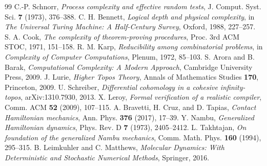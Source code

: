 \begin{thebibliography}{99}
 C.-P. Schnorr, \emph{Process complexity and effective random tests}, J. Comput. Syst. Sci. \textbf{7} (1973), 376--388.
 C. H. Bennett, \emph{Logical depth and physical complexity}, in \emph{The Universal Turing Machine: A Half-Century Survey}, Oxford, 1988, 227--257.
 S. A. Cook, \emph{The complexity of theorem-proving procedures}, Proc. 3rd ACM STOC, 1971, 151--158.
 R. M. Karp, \emph{Reducibility among combinatorial problems}, in \emph{Complexity of Computer Computations}, Plenum, 1972, 85--103.
 S. Arora and B. Barak, \emph{Computational Complexity: A Modern Approach}, Cambridge University Press, 2009.
 J. Lurie, \emph{Higher Topos Theory}, Annals of Mathematics Studies \textbf{170}, Princeton, 2009.
 U. Schreiber, \emph{Differential cohomology in a cohesive infinity-topos}, arXiv:1310.7930, 2013.
 X. Leroy, \emph{Formal verification of a realistic compiler}, Comm. ACM \textbf{52} (2009), 107--115.
 A. Bravetti, H. Cruz, and D. Tapias, \emph{Contact Hamiltonian mechanics}, Ann. Phys. \textbf{376} (2017), 17--39.
 Y. Nambu, \emph{Generalized Hamiltonian dynamics}, Phys. Rev. D \textbf{7} (1973), 2405--2412.
 L. Takhtajan, \emph{On foundation of the generalized Nambu mechanics}, Comm. Math. Phys. \textbf{160} (1994), 295--315.
 B. Leimkuhler and C. Matthews, \emph{Molecular Dynamics: With Deterministic and Stochastic Numerical Methods}, Springer, 2016.
\end{thebibliography}
